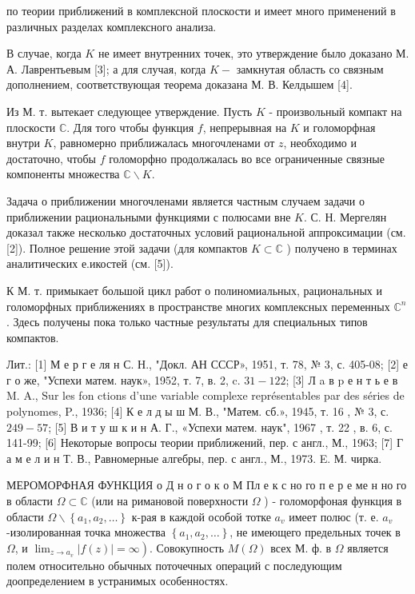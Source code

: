 \documentclass[10pt]{article}
\begin{document}
по теории приближений в комплексной плоскости и имеет много применений в различных разделах комплексного анализа.



В случае, когда $K$ не имеет внутренних точек, это утверждение было доказано М. А. Лаврентьевым [3]; а для случая, когда $K-$ замкнутая область со связным дополнением, соответствующая теорема доказана М. В. Келдышем [4].



Из М. т. вытекает следующее утверждение. Пусть $K$ - произвольный компакт на плоскости $\mathbb{C}$. Для того чтобы функция $f$, непрерывная на $K$ и голоморфная внутри $K$, равномерно приближалась многочленами от $z$, необходимо и достаточно, чтобы $f$ голоморфно продолжалась во все ограниченные связные компоненты множества $\mathbb{C} \backslash K$.



Задача о приближении многочленами является частным случаем задачи о приближении рациональными функциями с полюсами вне $K$. С. Н. Мергелян доказал также несколько достаточных условий рациональной аппроксимации (см. [2]). Полное решение этой задачи (для компактов $K \subset \mathbb{C}$ ) получено в терминах аналитических е.икостей (см. [5]).



К М. т. примыкает большой цикл работ о полиномиальных, рациональных и голоморфных приближениях в пространстве многих комплексных переменных $\mathbb{C}^{n}$. Здесь получены пока только частные результаты для специальных типов компактов.



Лит.: [1] М е р г е ля н С. Н., "Докл. АН СССР», 1951, т. 78, № 3, с. 405-08; [2] е г о же, "Успехи матем. наук», 1952, т. 7, в. 2, c. $31-122$; [3] Л a в p е н т ь е в M. A., Sur les fon ctions d'une variable complexe représentables par des séries de polynomes, P., 1936; [4] К е л д ы ш М. В., "Матем. сб.», 1945, т. 16 , № 3, с. $249-57$; [5] В и т у ш к и н А. Г., «Успехи матем. наук", 1967 , т. 22 , в. 6, с. 141-99; [6] Некоторые вопросы теории приближений, пер. с англ., М., 1963; [7] Г а м е л и н Т. В., Равномерные алгебры, пер. с англ., М., 1973. E. М. чирка.



МЕРОМОРФНАЯ ФУНКЦИЯ о Д н о г о к о М Пл е к с но го п е р е ме н но го в области $\Omega \subset \mathbb{C}$ (или на римановой поверхности $\Omega$ ) - голоморфоная функция в области $\Omega \backslash\left\{a_{1}, a_{2}, \ldots\right\}$ к-рая в каждой особой тотке $a_{v}$ имеет полюс (т. е. $a_{v}$-изолированная точка множества $\left\{a_{1}, a_{2}, \ldots\right\}$, не имеющего предельных точек в $\Omega$, и $\left.\lim _{z \rightarrow a_{v}}|f(z)|=\infty\right)$. Совокупность $M(\Omega)$ всех М. ф. в $\Omega$ является полем относительно обычных поточечных операций с последующим доопределением в устранимых особенностях.
\end{document}
